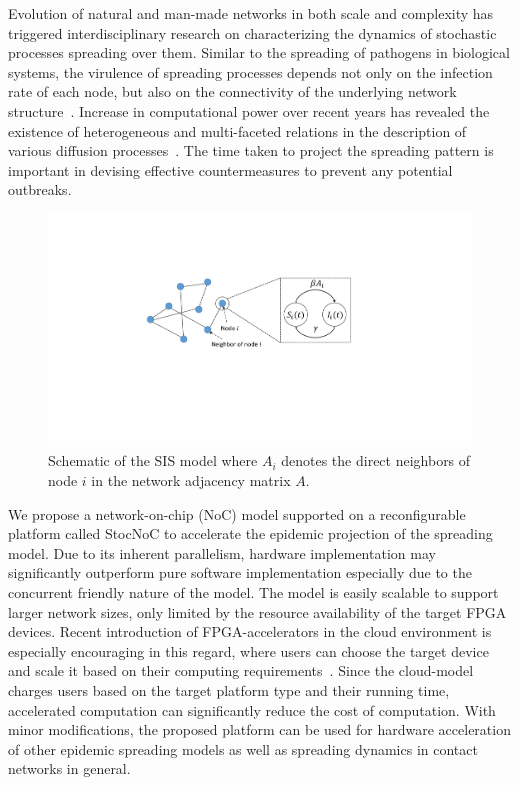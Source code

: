 Evolution of natural and man-made networks in both scale and complexity has triggered interdisciplinary research on characterizing the dynamics of stochastic processes spreading over them. 
Similar to the spreading of pathogens in biological systems, the virulence of spreading processes depends not only on the infection rate of each node, but also on the connectivity of the underlying network structure~\cite{Mieghem2014}. Increase in computational power over recent years has revealed the existence of heterogeneous and multi-faceted relations in the description of various diffusion processes~\cite{Newman2018}. %
The time taken to project the spreading pattern is important in devising effective countermeasures to prevent any potential outbreaks.
\begin{figure}[t!]
    \begin{center}
    \includegraphics[width=0.8\columnwidth]{Figures/SIS.pdf}
    \caption{Schematic of the SIS model where $A_i$ denotes the direct neighbors of node $i$ in the network adjacency matrix $A$.} 
    \label{figure:sis}
    \end{center}
    \vspace{-5mm}
\end{figure}

We propose a network-on-chip (NoC) model supported on a reconfigurable platform called StocNoC to accelerate the epidemic projection of the spreading model. Due to its inherent parallelism, hardware implementation may significantly outperform pure software implementation especially due to the concurrent friendly nature of the model. The model is easily scalable to support larger network sizes, only limited by the resource availability of the target FPGA devices. Recent introduction of FPGA-accelerators in the cloud environment is especially encouraging in this regard, where users can choose the target device and scale it based on their computing requirements~\cite{Parimal2018}. Since the cloud-model charges users based on the target platform type and their running time, accelerated computation can significantly reduce the cost of computation. With minor modifications, the proposed platform can be used for hardware acceleration of other epidemic spreading models as well as spreading dynamics in contact networks in general.

